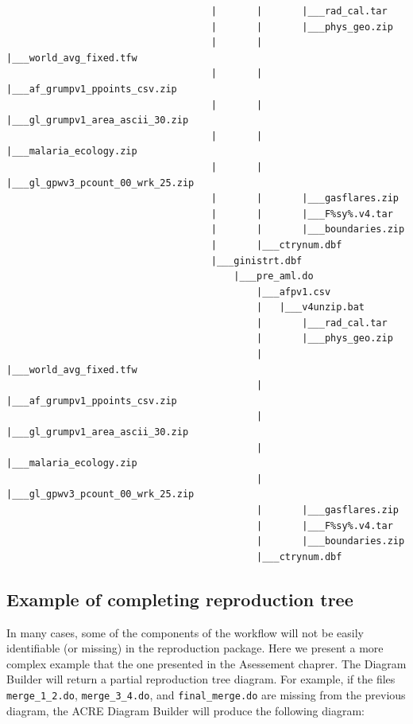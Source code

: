 \documentclass[]{book}
\begin{document}
\begin{verbatim}
                                    |       |       |___rad_cal.tar
                                    |       |       |___phys_geo.zip
                                    |       |       |___world_avg_fixed.tfw
                                    |       |       |___af_grumpv1_ppoints_csv.zip
                                    |       |       |___gl_grumpv1_area_ascii_30.zip
                                    |       |       |___malaria_ecology.zip
                                    |       |       |___gl_gpwv3_pcount_00_wrk_25.zip
                                    |       |       |___gasflares.zip
                                    |       |       |___F%sy%.v4.tar
                                    |       |       |___boundaries.zip
                                    |       |___ctrynum.dbf
                                    |___ginistrt.dbf
                                        |___pre_aml.do
                                            |___afpv1.csv
                                            |   |___v4unzip.bat
                                            |       |___rad_cal.tar
                                            |       |___phys_geo.zip
                                            |       |___world_avg_fixed.tfw
                                            |       |___af_grumpv1_ppoints_csv.zip
                                            |       |___gl_grumpv1_area_ascii_30.zip
                                            |       |___malaria_ecology.zip
                                            |       |___gl_gpwv3_pcount_00_wrk_25.zip
                                            |       |___gasflares.zip
                                            |       |___F%sy%.v4.tar
                                            |       |___boundaries.zip
                                            |___ctrynum.dbf
\end{verbatim}

\hypertarget{example-of-completing-reproduction-tree}{%
\subsection{Example of completing reproduction tree}\label{example-of-completing-reproduction-tree}}

In many cases, some of the components of the workflow will not be easily identifiable (or missing) in the reproduction package. Here we present a more complex example that the one presented in the Asessement chaprer. The Diagram Builder will return a partial reproduction tree diagram. For example, if the files \texttt{merge\_1\_2.do}, \texttt{merge\_3\_4.do}, and \texttt{final\_merge.do} are missing from the previous diagram, the ACRE Diagram Builder will produce the following diagram:
\end{document}
